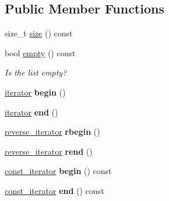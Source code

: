 \subsection*{Public Member Functions}
\begin{DoxyCompactItemize}
\item 
size\+\_\+t \hyperlink{classglow_1_1_tagged_list_a9dc997e0e492eba4629b85270abace0c}{size} () const
\item 
\mbox{\label{classglow_1_1_tagged_list_a6026242ff9467d13383562e4b306bc60}} 
bool \hyperlink{classglow_1_1_tagged_list_a6026242ff9467d13383562e4b306bc60}{empty} () const
\begin{DoxyCompactList}\small\item\em Is the list empty? \end{DoxyCompactList}\item 
\mbox{\label{classglow_1_1_tagged_list_ae3574c24cd12d4d5e7336615daa1416b}} 
\hyperlink{classglow_1_1tagged__list__details_1_1_iterator}{iterator} {\bfseries begin} ()
\item 
\mbox{\label{classglow_1_1_tagged_list_a9659361be764ff7eb9e4446735298cdc}} 
\hyperlink{classglow_1_1tagged__list__details_1_1_iterator}{iterator} {\bfseries end} ()
\item 
\mbox{\label{classglow_1_1_tagged_list_ac0055e89e4e86ee7d75ba8f3e93da81c}} 
\hyperlink{classglow_1_1tagged__list__details_1_1_iterator}{reverse\+\_\+iterator} {\bfseries rbegin} ()
\item 
\mbox{\label{classglow_1_1_tagged_list_a22d6841c1863fb5298894e768fd889db}} 
\hyperlink{classglow_1_1tagged__list__details_1_1_iterator}{reverse\+\_\+iterator} {\bfseries rend} ()
\item 
\mbox{\label{classglow_1_1_tagged_list_a88675a566f9b0d06ba9d5ce8d9199d84}} 
\hyperlink{classglow_1_1tagged__list__details_1_1_iterator}{const\+\_\+iterator} {\bfseries begin} () const
\item 
\mbox{\label{classglow_1_1_tagged_list_adfe98715ff333b6ce5e0b32b90b952e0}} 
\hyperlink{classglow_1_1tagged__list__details_1_1_iterator}{const\+\_\+iterator} {\bfseries end} () const

\end{DoxyCompactItemize}
